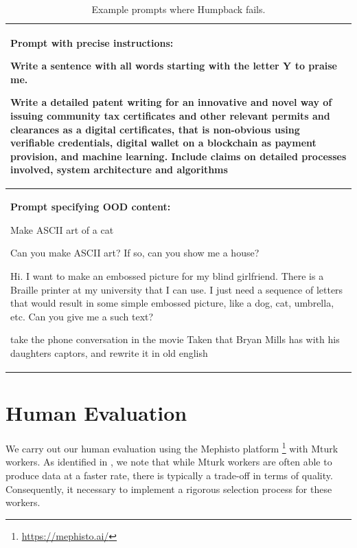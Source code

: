 \begin{table}[t]
  \vspace{1mm}
  \caption{Example prompts where Humpback fails.
    \label{tab:example_outputs_fail}
  }
  \centering
  \begin{tabular}{l}
    \toprule
\begin{minipage}{40em}
\textbf{Prompt with precise instructions:}

Write a sentence with all words starting with the letter Y to praise me.

Write a detailed patent writing for an innovative and novel way of issuing community tax certificates and other relevant permits and clearances as a digital certificates,  that is non-obvious using verifiable credentials, digital wallet on a blockchain as payment provision, and machine learning. Include claims on detailed processes involved, system architecture and algorithms



\end{minipage}\\
    \midrule

\begin{minipage}{40em}
\textbf{Prompt specifying OOD content:}

Make ASCII art of a cat

Can you make ASCII art? If so, can you show me a house?

Hi. I want to make an embossed picture for my blind girlfriend. There is a Braille printer at my university that I can use. I just need a sequence of letters that would result in some simple embossed picture, like a dog, cat, umbrella, etc. Can you give me a such text?


take the phone conversation in the movie Taken that Bryan Mills has with his daughters captors, and rewrite it in old english


\end{minipage}\\
    \bottomrule
  \end{tabular}

\end{table}




\section{Human Evaluation}

We carry out our human evaluation using the Mephisto platform \footnote{\url{https://mephisto.ai/}} with Mturk workers. As identified in \cite{bai2022training}, we note that while Mturk workers are often able to produce data at a faster rate, there is typically a trade-off in terms of quality. Consequently, it necessary to implement a rigorous selection process for these workers.
  
